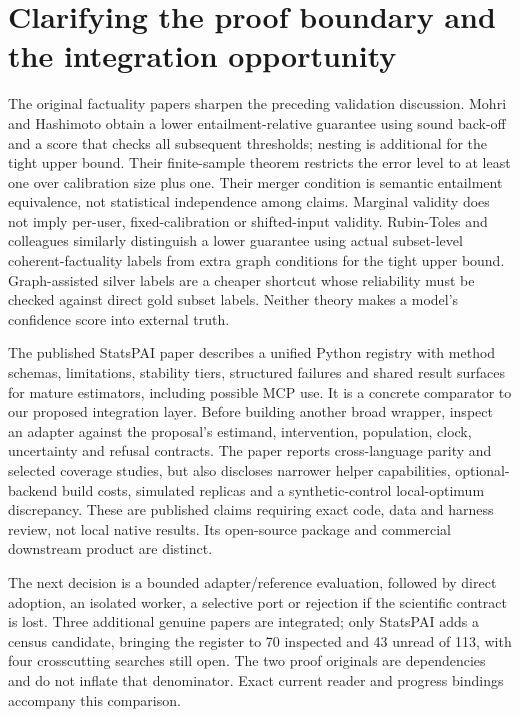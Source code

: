 \hypertarget{clarifying-the-proof-boundary-and-the-integration-opportunity}{%
\section{Clarifying the proof boundary and the integration
opportunity}\label{clarifying-the-proof-boundary-and-the-integration-opportunity}}

The original factuality papers sharpen the preceding validation
discussion. Mohri and Hashimoto obtain a lower entailment-relative
guarantee using sound back-off and a score that checks all subsequent
thresholds; nesting is additional for the tight upper bound. Their
finite-sample theorem restricts the error level to at least one over
calibration size plus one. Their merger condition is semantic entailment
equivalence, not statistical independence among claims. Marginal
validity does not imply per-user, fixed-calibration or shifted-input
validity. Rubin-Toles and colleagues similarly distinguish a lower
guarantee using actual subset-level coherent-factuality labels from
extra graph conditions for the tight upper bound. Graph-assisted silver
labels are a cheaper shortcut whose reliability must be checked against
direct gold subset labels. Neither theory makes a model's confidence
score into external truth.
\citep{exec23_mohri_factuality,exec23_coherent_factuality}

The published StatsPAI paper describes a unified Python registry with
method schemas, limitations, stability tiers, structured failures and
shared result surfaces for mature estimators, including possible MCP
use. It is a concrete comparator to our proposed integration layer.
Before building another broad wrapper, inspect an adapter against the
proposal's estimand, intervention, population, clock, uncertainty and
refusal contracts. The paper reports cross-language parity and selected
coverage studies, but also discloses narrower helper capabilities,
optional-backend build costs, simulated replicas and a synthetic-control
local-optimum discrepancy. These are published claims requiring exact
code, data and harness review, not local native results. Its open-source
package and commercial downstream product are distinct.
\citep{exec23_statspai_paper}

The next decision is a bounded adapter/reference evaluation, followed by
direct adoption, an isolated worker, a selective port or rejection if
the scientific contract is lost. Three additional genuine papers are
integrated; only StatsPAI adds a census candidate, bringing the register
to 70 inspected and 43 unread of 113, with four crosscutting searches
still open. The two proof originals are dependencies and do not inflate
that denominator. Exact current reader and progress bindings accompany
this comparison. \citep{sp23proof_reader,sp23proof_progress}

